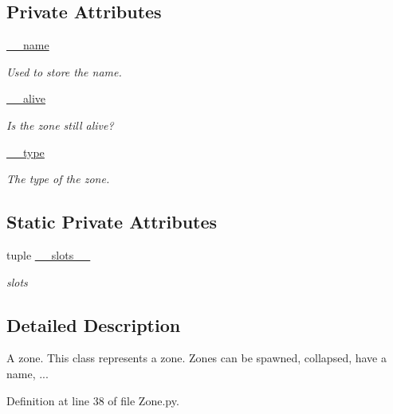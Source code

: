\subsection*{Private Attributes}
\begin{DoxyCompactItemize}
\item 
\hyperlink{class_zone_1_1_zone_a72ab1886c15120f42281d35955ab21b5}{\_\-\_\-name}
\begin{DoxyCompactList}\small\item\em Used to store the name. \item\end{DoxyCompactList}\item 
\hyperlink{class_zone_1_1_zone_a1c4e31d1327ad4d7a2c31a2b7fcde5e7}{\_\-\_\-alive}
\begin{DoxyCompactList}\small\item\em Is the zone still alive? \item\end{DoxyCompactList}\item 
\hyperlink{class_zone_1_1_zone_a5164f57edacb2b3a7b3dfca3ba949139}{\_\-\_\-type}
\begin{DoxyCompactList}\small\item\em The type of the zone. \item\end{DoxyCompactList}\end{DoxyCompactItemize}
\subsection*{Static Private Attributes}
\begin{DoxyCompactItemize}
\item 
tuple \hyperlink{class_zone_1_1_zone_ad5bde96ea6dea6f68ee68d33a6c90850}{\_\-\_\-slots\_\-\_\-}
\begin{DoxyCompactList}\small\item\em slots \item\end{DoxyCompactList}\end{DoxyCompactItemize}


\subsection{Detailed Description}
A zone. This class represents a zone. Zones can be spawned, collapsed, have a name, ... 

Definition at line 38 of file Zone.py.



